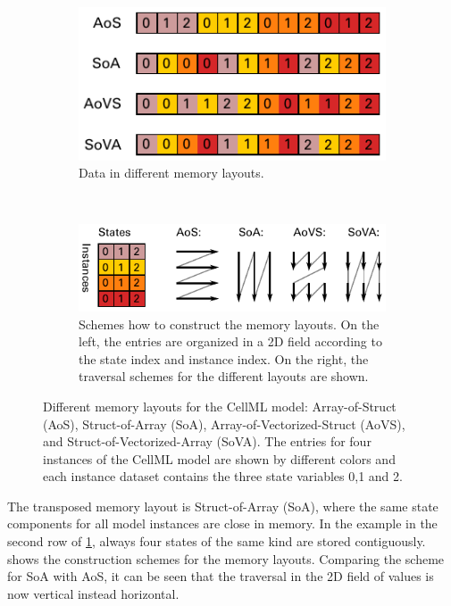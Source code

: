 \begin{figure}%
  \centering%
  \begin{subfigure}[t]{0.6\textwidth}%
    \centering%
    \includegraphics[width=\textwidth]{images/implementation/memory_layouts.pdf}
    \caption{Data in different memory layouts.}%
    \label{fig:memory_layouts}%
  \end{subfigure}\\[4mm]
  \begin{subfigure}[t]{0.7\textwidth}%
    \centering%
    \includegraphics[width=\textwidth]{images/implementation/memory_layouts1.pdf}%
    \caption{Schemes how to construct the memory layouts. On the left, the entries are organized in a 2D field according to the state index and instance index. On the right, the traversal schemes for the different layouts are shown.}%
    \label{fig:memory_layouts1}%
  \end{subfigure}
  \caption{Different memory layouts for the CellML model: Array-of-Struct (AoS), Struct-of-Array (SoA), Array-of-Vectorized-Struct (AoVS), and Struct-of-Vectorized-Array (SoVA). The entries for four instances of the CellML model are shown by different colors and each instance dataset contains the three state variables 0,1 and 2.}%
  \label{fig:memory_layouts_both}%
\end{figure}%

The transposed memory layout is Struct-of-Array (SoA), where the same state components for all model instances are close in memory. In the example in the second row of \cref{fig:memory_layouts}, always four states of the same kind are stored contiguously. 
 shows the construction schemes for the memory layouts. Comparing the scheme for SoA with AoS, it can be seen that the traversal in the 2D field of values is now vertical instead horizontal.

